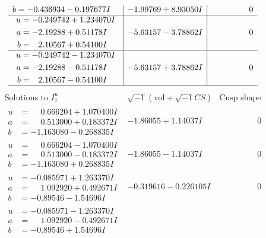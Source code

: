 \documentclass[1p]{elsarticle_modified}
\theoremstyle{definition}
\newcommand{\I}{\sqrt{-1}}
\begin{document}
$$\begin{array}{c|c|c}
\begin{aligned}
b &= -0.436934 - 0.197677 I\end{aligned}
 & -1.99769 + 8.93050 I & \phantom{-0.000000 } 0 \\ \hline\begin{aligned}
u &= -0.249742 + 1.234070 I \\
a &= -2.19288 + 0.51178 I \\
b &= \phantom{-}2.10567 + 0.54100 I\end{aligned}
 & -5.63157 - 3.78862 I & \phantom{-0.000000 } 0 \\ \hline\begin{aligned}
u &= -0.249742 - 1.234070 I \\
a &= -2.19288 - 0.51178 I \\
b &= \phantom{-}2.10567 - 0.54100 I\end{aligned}
 & -5.63157 + 3.78862 I & \phantom{-0.000000 } 0\\
 \hline 
 \end{array}$$\newpage$$\begin{array}{c|c|c}  
\text{Solutions to }I^u_{1}& \I (\text{vol} + \sqrt{-1}CS) & \text{Cusp shape}\\
 \hline 
\begin{aligned}
u &= \phantom{-}0.666204 + 1.070400 I \\
a &= \phantom{-}0.513000 + 0.183372 I \\
b &= -1.163080 - 0.268835 I\end{aligned}
 & -1.86055 + 1.14037 I & \phantom{-0.000000 } 0 \\ \hline\begin{aligned}
u &= \phantom{-}0.666204 - 1.070400 I \\
a &= \phantom{-}0.513000 - 0.183372 I \\
b &= -1.163080 + 0.268835 I\end{aligned}
 & -1.86055 - 1.14037 I & \phantom{-0.000000 } 0 \\ \hline\begin{aligned}
u &= -0.085971 + 1.263370 I \\
a &= \phantom{-}1.092920 + 0.492671 I \\
b &= -0.89546 - 1.54696 I\end{aligned}
 & -0.319616 - 0.226105 I & \phantom{-0.000000 } 0 \\ \hline\begin{aligned}
u &= -0.085971 - 1.263370 I \\
a &= \phantom{-}1.092920 - 0.492671 I \\
b &= -0.89546 + 1.54696 I\end{aligned}

\end{array}$$
\end{document}
